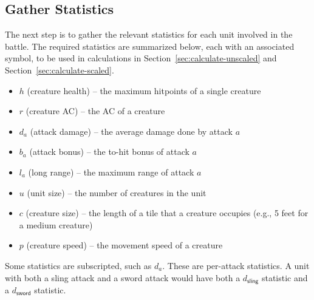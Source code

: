 \subsection{Gather Statistics}

The next step is to gather the relevant statistics
for each unit involved in the battle.
The required statistics are summarized below,
each with an associated symbol,
to be used in calculations in Section~\ref{sec:calculate-unscaled} and Section~\ref{sec:calculate-scaled}.
%
\begin{itemize}
    \item $h$ (creature health) -- the maximum hitpoints of a single creature
    \item $r$ (creature AC) -- the AC of a creature
    \item $d_a$ (attack damage) -- the average damage done by attack $a$
    \item $b_a$ (attack bonus) -- the to-hit bonus of attack $a$
    \item $l_a$ (long range) -- the maximum range of attack $a$
    \item $u$ (unit size) -- the number of creatures in the unit
    \item $c$ (creature size) -- the length of a tile that a creature occupies
        (e.g., 5 feet for a medium creature)
    \item $p$ (creature speed) -- the movement speed of a creature
\end{itemize}
%
Some statistics are subscripted, such as $d_a$.
These are per-attack statistics.
A unit with both a sling attack and a sword attack
would have both a $d_\textsf{sling}$ statistic
and a $d_\textsf{sword}$ statistic.